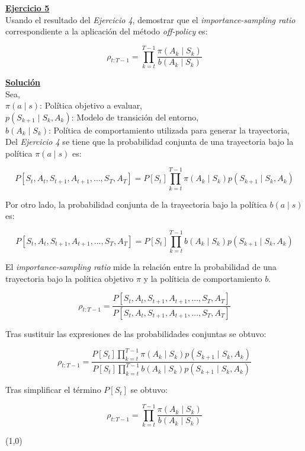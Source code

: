 \indent\underline{\textbf{Ejercicio 5}}\\
Usando el resultado del \textit{Ejercicio 4}, demostrar que el \textit{importance-sampling ratio} correspondiente a la aplicación del método \textit{off-policy} es:

\[
    \rho_{t:T-1} = \prod_{k=t}^{T-1} \frac{\pi(A_k \mid S_k)}{b(A_k \mid S_k)}
\]

\indent\underline{\textbf{Solución}}\\

Sea,\\
$\pi(a \mid s)$: Política objetivo a evaluar,\\
$p(S_{k+1} \mid S_k, A_k)$: Modelo de transición del entorno,\\
$b(A_k \mid S_k)$: Política de comportamiento utilizada para generar la trayectoria,\\

Del \textit{Ejercicio 4} se tiene que la probabilidad conjunta de una trayectoria bajo la política $\pi(a \mid s)$ es:

\[
    P[S_t,A_t,S_{t+1},A_{t+1},\ldots,S_T,A_T] = P[S_t] \prod_{k=t}^{T-1} \pi(A_k \mid S_k) p(S_{k+1} \mid S_k, A_k)
\]

Por otro lado, la probabilidad conjunta de la trayectoria bajo la política $b(a \mid s)$ es:

\[
    P[S_t,A_t,S_{t+1},A_{t+1},\ldots,S_T,A_T] = P[S_t] \prod_{k=t}^{T-1} b(A_k \mid S_k) p(S_{k+1} \mid S_k, A_k)
\]

El \textit{importance-sampling ratio} mide la relación entre la probabilidad de una trayectoria bajo la política objetivo $\pi$ y la políticia de comportamiento $b$.

\[
    \rho_{t:T-1} = \frac{P[S_t,A_t,S_{t+1},A_{t+1},\ldots,S_T,A_T]}{P[S_t,A_t,S_{t+1},A_{t+1},\ldots,S_T,A_T]}
\]

Tras sustituir las expresiones de las probabilidades conjuntas se obtuvo:

\[
    \rho_{t:T-1} = \frac{P[S_t] \prod_{k=t}^{T-1} \pi(A_k \mid S_k) p(S_{k+1} \mid S_k, A_k)}{P[S_t] \prod_{k=t}^{T-1} b(A_k \mid S_k) p(S_{k+1} \mid S_k, A_k)}
\]

Tras simplificar el término $P[S_t]$ se obtuvo:

\[
    \rho_{t:T-1} = \prod_{k=t}^{T-1} \frac{\pi(A_k \mid S_k)}{b(A_k \mid S_k)}
\]

\line(1,0){\textwidth}

